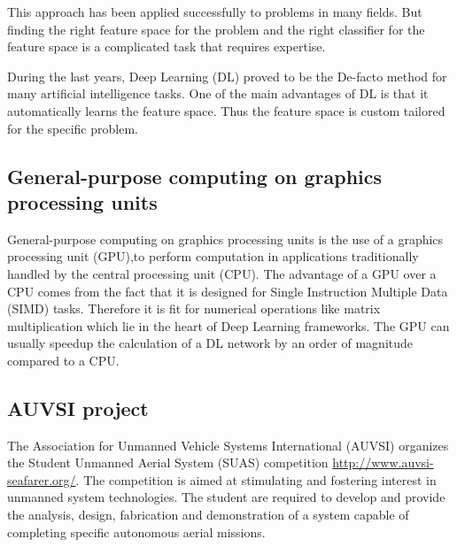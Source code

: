 \documentclass{article} %
\begin{document}
This approach has been applied successfully to problems in many fields. But
finding the right
feature space for the problem and the right classifier for the feature space is
a complicated task that requires expertise.

During the last years, Deep Learning (DL) proved to be the De-facto method for
many artificial intelligence tasks. One of the main advantages of DL is that
it automatically learns the feature space. Thus the feature space is custom
tailored for the specific problem.

\subsection{General-purpose computing on graphics processing units}

General-purpose computing on graphics processing units is the use of a
graphics processing unit (GPU),to perform computation in applications traditionally
handled by the central processing unit (CPU). The advantage of a GPU over a
CPU comes from the fact that it is designed for Single Instruction Multiple Data (SIMD) tasks.
Therefore it is fit for numerical operations like matrix multiplication
which lie in the heart of Deep Learning frameworks. The GPU can usually speedup
the calculation of a DL network by an order of magnitude compared to a CPU.

\subsection{AUVSI project}

The Association for Unmanned Vehicle Systems International (AUVSI)
organizes the Student Unmanned Aerial System (SUAS) competition
\url{http://www.auvsi-seafarer.org/}. The competition is aimed  at
stimulating and fostering interest in unmanned system technologies.
The  student  are required  to  develop  and  provide  the  analysis,
design, fabrication and demonstration of a system capable of completing
specific autonomous aerial missions.
\end{document}
